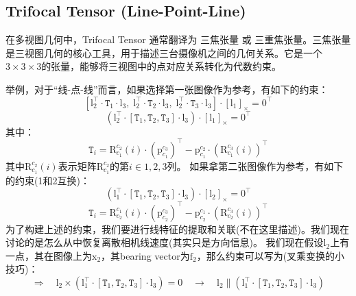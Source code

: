 \documentclass[12pt, onecolumn]{article}
\newcommand\liehat[1]{\left[ #1 \right]_\times}
\newcommand\bsm[1]{\boldsymbol{\mathrm{#1}}}
\newcommand\rotation[2]{{\bsm{R}_{#1}^{#2}}}
\newcommand\translation[2]{{\bsm{p}_{#1}^{#2}}}
\begin{document}
	\subsection{Trifocal Tensor (Line-Point-Line)}
	在多视图几何中，Trifocal Tensor 通常翻译为 三焦张量 或 三重焦张量。三焦张量 是三视图几何的核心工具，用于描述三台摄像机之间的几何关系。它是一个$3\times3\times3$的张量，能够将三视图中的点对应关系转化为代数约束。
	
	举例，对于“线-点-线”而言，如果选择第一张图像作为参考，有如下的约束：
	\begin{equation}
	\left[ \bsm{l}_2^\top\cdot\texttt{T}_1\cdot\bsm{l}_3,\;
	\bsm{l}_2^\top\cdot\texttt{T}_2\cdot\bsm{l}_3,\;
	\bsm{l}_2^\top\cdot\texttt{T}_3\cdot\bsm{l}_3\right]   \cdot\liehat{\bsm{l}_1}=\bsm{0}^\top
	\end{equation}
	\begin{equation}
	\left(\bsm{l}_2^\top\cdot\left[ \texttt{T}_1,\texttt{T}_2,\texttt{T}_3\right]\cdot\bsm{l}_3  \right) \cdot\liehat{\bsm{l}_1}=\bsm{0}^\top
	\end{equation}
	其中：
	\begin{equation}
	\label{equ:fir_ref_ti}
	\texttt{T}_i=\rotation{c_1}{c_2}(i)\cdot\left( \translation{c_1}{c_3}\right)^\top-\translation{c_1}{c_2}\cdot\left(\rotation{c_1}{c_3}(i)\right)^\top
	\end{equation}
	其中$\rotation{c_1}{c_2}(i)$表示矩阵$\rotation{c_1}{c_2}$的第$i\in1,2,3$列。
	如果拿第二张图像作为参考，有如下的约束(1和2互换)：
	\begin{equation}
	\left(\bsm{l}_1^\top\cdot\left[ \texttt{T}_1,\texttt{T}_2,\texttt{T}_3\right]\cdot\bsm{l}_3  \right) \cdot\liehat{\bsm{l}_2}=\bsm{0}^\top
	\end{equation}
	\begin{equation}
	\texttt{T}_i=\rotation{c_2}{c_1}(i)\cdot\left( \translation{c_2}{c_3}\right)^\top-\translation{c_2}{c_1}\cdot\left(\rotation{c_2}{c_3}(i)\right)^\top
	\end{equation}
	为了构建上述的约束，我们要进行线特征的提取和关联(不在这里描述)。我们现在讨论的是怎么从中恢复离散相机线速度(其实只是方向信息)。
	我们现在假设$\bsm{l}_2$上有一点，其在图像上为$\bsm{x}_2$，其bearing vector为$\bsm{f}_2$，那么约束可以写为(叉乘变换的小技巧)：
	\begin{equation}
	\Rightarrow\quad\bsm{l}_2\times\left(\bsm{l}_1^\top\cdot\left[ \texttt{T}_1,\texttt{T}_2,\texttt{T}_3\right]\cdot\bsm{l}_3  \right) =\bsm{0}
	\quad\to\quad
	\bsm{l}_2\parallel\left(\bsm{l}_1^\top\cdot\left[ \texttt{T}_1,\texttt{T}_2,\texttt{T}_3\right]\cdot\bsm{l}_3  \right)
	\end{equation}
\end{document}

